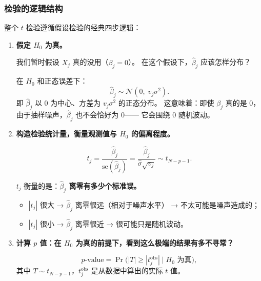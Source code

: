 \subsubsection{检验的逻辑结构}

整个 $t$ 检验遵循假设检验的经典四步逻辑：

\begin{enumerate}[label=\textbf{第 \arabic* 步：}, leftmargin=*]

    \item \textbf{假定 $H_0$ 为真。}
    
    我们暂时假设 $X_j$ 真的没用（$\beta_j = 0$）。
    在这个假设下，$\hat{\beta}_j$ 应该怎样分布？

    在 $H_0$ 和正态误差下：
    \[
        \hat{\beta}_j \sim \mathcal{N}(0,\; v_j\sigma^2).
    \]
    即 $\hat{\beta}_j$ 以 0 为中心、方差为 $v_j\sigma^2$ 的正态分布。
    这意味着：即使 $\beta_j$ 真的是 0，由于抽样噪声，$\hat{\beta}_j$ 也不会恰好为 0——
    它会围绕 0 随机波动。

    \item \textbf{构造检验统计量，衡量观测值与 $H_0$ 的偏离程度。}
    
    \begin{definition}[$t$ 统计量]
    \begin{equation}\label{eq:t_stat}
        \boxed{t_j = \frac{\hat{\beta}_j}{\mathrm{se}(\hat{\beta}_j)}
        = \frac{\hat{\beta}_j}{\hat{\sigma} \sqrt{v_j}} \sim t_{N-p-1}}.
    \end{equation}
    \end{definition}

    $t_j$ 衡量的是：\textbf{$\hat{\beta}_j$ 离零有多少个标准误。}
    \begin{itemize}
        \item $|t_j|$ 很大 → $\hat{\beta}_j$ 离零很远（相对于噪声水平） → 不太可能是噪声造成的；
        \item $|t_j|$ 很小 → $\hat{\beta}_j$ 离零很近 → 很可能只是随机波动。
    \end{itemize}

    \item \textbf{计算 $p$ 值：在 $H_0$ 为真的前提下，看到这么极端的结果有多不寻常？}
    
    \begin{definition}[$p$ 值]
    \begin{equation}\label{eq:p_value}
        p\text{-value} = \Pr\big(|T| \ge |t_j^{\text{obs}}| \;\big|\; H_0 \text{ 为真}\big),
    \end{equation}
    其中 $T \sim t_{N-p-1}$，$t_j^{\text{obs}}$ 是从数据中算出的实际 $t$ 值。
    \end{definition}


\end{enumerate}
